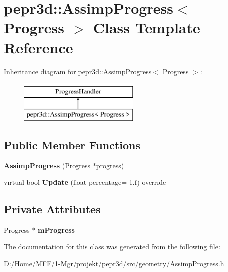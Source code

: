 \hypertarget{classpepr3d_1_1_assimp_progress}{}\section{pepr3d\+::Assimp\+Progress$<$ Progress $>$ Class Template Reference}
\label{classpepr3d_1_1_assimp_progress}
Inheritance diagram for pepr3d\+::Assimp\+Progress$<$ Progress $>$\+:\begin{figure}[H]
\begin{center}
\leavevmode
\includegraphics[height=2.000000cm]{classpepr3d_1_1_assimp_progress}
\end{center}
\end{figure}
\subsection*{Public Member Functions}
\begin{DoxyCompactItemize}
\item 
\mbox{\label{classpepr3d_1_1_assimp_progress_aa839af95665149e0572ad2f8ab2aa056}} 
{\bfseries Assimp\+Progress} (Progress $\ast$progress)
\item 
\mbox{\label{classpepr3d_1_1_assimp_progress_a3cce9ce3f66ff7c1bca017ec0e1caa04}} 
virtual bool {\bfseries Update} (float percentage=-\/1.f) override
\end{DoxyCompactItemize}
\subsection*{Private Attributes}
\begin{DoxyCompactItemize}
\item 
\mbox{\label{classpepr3d_1_1_assimp_progress_ac6743a64c1e024474f694e29efcd8be1}} 
Progress $\ast$ {\bfseries m\+Progress}
\end{DoxyCompactItemize}


The documentation for this class was generated from the following file\+:\begin{DoxyCompactItemize}
\item 
D\+:/\+Home/\+M\+F\+F/1-\/\+Mgr/projekt/pepr3d/src/geometry/Assimp\+Progress.\+h\end{DoxyCompactItemize}
